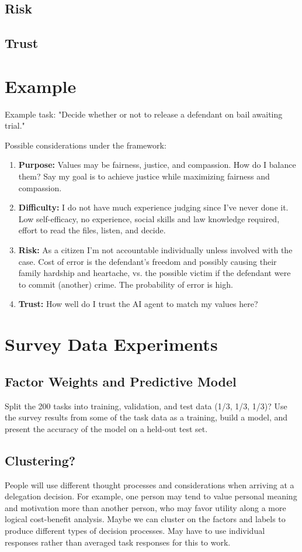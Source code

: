 \documentclass[letterpaper]{article} %
\begin{document}
\subsection{Risk}
\subsection{Trust}


\section{Example}
Example task: "Decide whether or not to release a defendant on bail awaiting trial."

Possible considerations under the framework:
\begin{enumerate}
    \item \textbf{Purpose:} Values may be fairness, justice, and compassion. How do I balance them? Say my goal is to achieve justice while maximizing fairness and compassion. 
    \item \textbf{Difficulty:} I do not have much experience judging since I've never done it. Low self-efficacy, no experience, social skills and law knowledge required, effort to read the files, listen, and decide. 
    \item \textbf{Risk:} As a citizen I'm not accountable individually unless involved with the case. Cost of error is the defendant's freedom and possibly causing their family hardship and heartache, vs. the possible victim if the defendant were to commit (another) crime. The probability of error is high.
    \item \textbf{Trust:} How well do I trust the AI agent to match my values here? 
\end{enumerate}

\section{Survey Data Experiments}

\subsection{Factor Weights and Predictive Model}
Split the 200 tasks into training, validation, and test data (1/3, 1/3, 1/3)? Use the survey results from some of the task data as a training, build a model, and present the accuracy of the model on a held-out test set.

\subsection{Clustering?}
People will use different thought processes and considerations when arriving at a delegation decision. For example, one person may tend to value personal meaning and motivation more than another person, who may favor utility along a more logical cost-benefit analysis. Maybe we can cluster on the factors and labels to produce different types of decision processes. May have to use individual responses rather than averaged task responses for this to work. 
\end{document}
